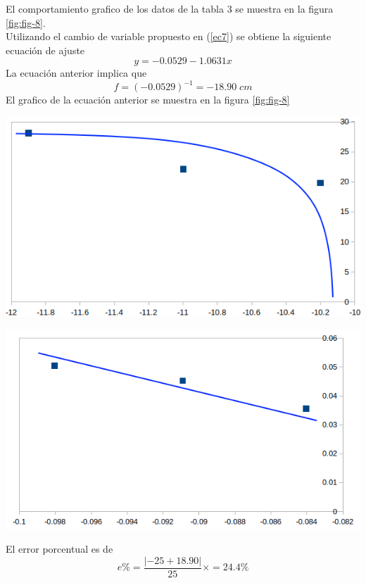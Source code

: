 \documentclass[13,twocolumn,letterpaper]{article}
\newenvironment{Figure}{\par\medskip\noindent\minipage{\linewidth}}{\endminipage\par\medskip}
\begin{document}
\begin{multicols}{2}
	
	El comportamiento grafico de los datos de la tabla 3 se muestra en la figura \ref{fig:fig-8}.  \\
	Utilizando el cambio de variable propuesto en (\ref{ec7}) se obtiene la siguiente ecuación de ajuste
	\begin{equation}
	y=-0.0529-1.0631x
	\end{equation}
	La ecuación anterior implica que 
	$$f=(-0.0529)^{-1}=-18.90\;cm$$
	El grafico de la ecuación anterior se muestra en la figura \ref{fig:fig-8}
	\begin{Figure}
		\centering
		\includegraphics[width=\linewidth]{fig8}
		\label{fig:fig-8}
	\end{Figure}
	\begin{Figure}
		\centering
		\includegraphics[width=\linewidth]{fig9}
		\label{fig:fig-9}
	\end{Figure}
	El error porcentual es de 
	$$e\%=\dfrac{|-25+18.90|}{25}\times  =24.4\%$$
	

\end{multicols}
\end{document}
